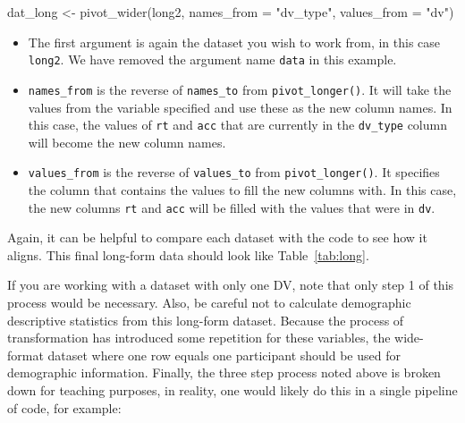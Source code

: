 \documentclass[
  english,
  doc,floatsintext]{apa6}
\newenvironment{Shaded}{\begin{snugshade}}{\end{snugshade}}
\newcommand{\AttributeTok}[1]{\textcolor[rgb]{0.77,0.63,0.00}{#1}}
\newcommand{\FunctionTok}[1]{\textcolor[rgb]{0.00,0.00,0.00}{#1}}
\newcommand{\NormalTok}[1]{#1}
\newcommand{\OtherTok}[1]{\textcolor[rgb]{0.56,0.35,0.01}{#1}}
\newcommand{\StringTok}[1]{\textcolor[rgb]{0.31,0.60,0.02}{#1}}
\begin{document}
\begin{Shaded}
\begin{Highlighting}[]
\NormalTok{dat\_long }\OtherTok{\textless{}{-}} \FunctionTok{pivot\_wider}\NormalTok{(long2, }
                        \AttributeTok{names\_from =} \StringTok{"dv\_type"}\NormalTok{, }
                        \AttributeTok{values\_from =} \StringTok{"dv"}\NormalTok{)}
\end{Highlighting}
\end{Shaded}

\begin{itemize}
\item
  The first argument is again the dataset you wish to work from, in this case \texttt{long2}. We have removed the argument name \texttt{data} in this example.
\item
  \texttt{names\_from} is the reverse of \texttt{names\_to} from \texttt{pivot\_longer()}. It will take the values from the variable specified and use these as the new column names. In this case, the values of \texttt{rt} and \texttt{acc} that are currently in the \texttt{dv\_type} column will become the new column names.
\item
  \texttt{values\_from} is the reverse of \texttt{values\_to} from \texttt{pivot\_longer()}. It specifies the column that contains the values to fill the new columns with. In this case, the new columns \texttt{rt} and \texttt{acc} will be filled with the values that were in \texttt{dv}.
\end{itemize}

Again, it can be helpful to compare each dataset with the code to see how it aligns. This final long-form data should look like Table~\ref{tab:long}.

If you are working with a dataset with only one DV, note that only step 1 of this process would be necessary. Also, be careful not to calculate demographic descriptive statistics from this long-form dataset. Because the process of transformation has introduced some repetition for these variables, the wide-format dataset where one row equals one participant should be used for demographic information. Finally, the three step process noted above is broken down for teaching purposes, in reality, one would likely do this in a single pipeline of code, for example:
\end{document}
